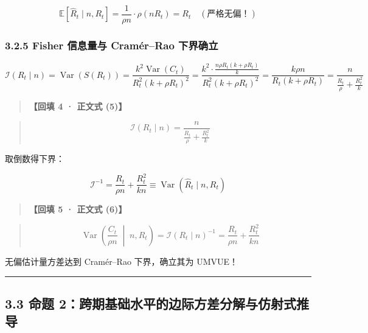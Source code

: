 \documentclass[11pt,a4paper]{ctexart}
\begin{document}
\[
\mathbb{E}[\widehat{R}_t \mid n, R_t] = \frac{1}{\rho n} \cdot \rho (n R_t) = R_t \quad (\text{严格无偏！})
\]

\subsubsection{3.2.5 Fisher 信息量与 Cramér–Rao 下界确立}
\[
\mathcal{I}(R_t \mid n) = \operatorname{Var}(S(R_t)) = \frac{k^2 \operatorname{Var}(C_t)}{R_t^2(k + \rho R_t)^2} = \frac{k^2 \cdot \frac{n \rho R_t (k + \rho R_t)}{k}}{R_t^2(k + \rho R_t)^2} = \frac{k \rho n}{R_t(k + \rho R_t)} = \frac{n}{\frac{R_t}{\rho} + \frac{R_t^2}{k}}
\]

\begin{quote}\small\color{black!75}
\textbf{【回填 4 · 正文式 (5)】}
\end{quote}
\begin{quote}\small\color{black!75}
\begin{equation*}
\mathcal{I}(R_t \mid n) = \frac{n}{\frac{R_t}{\rho} + \frac{R_t^2}{k}} \tag{eq:fisher\_info}
\end{equation*}
\end{quote}

取倒数得下界：

\[
\mathcal{I}^{-1} = \frac{R_t}{\rho n} + \frac{R_t^2}{kn} \equiv \operatorname{Var}(\widehat{R}_t \mid n, R_t)
\]

\begin{quote}\small\color{black!75}
\textbf{【回填 5 · 正文式 (6)】}
\end{quote}
\begin{quote}\small\color{black!75}
\begin{equation*}
\operatorname{Var}\!\left(\frac{C_t}{\rho n} \;\middle|\; n, R_t\right) = \mathcal{I}(R_t \mid n)^{-1} = \frac{R_t}{\rho n} + \frac{R_t^2}{k n} \tag{eq:var\_prop1}
\end{equation*}
\end{quote}

无偏估计量方差达到 Cramér–Rao 下界，确立其为 UMVUE！


\vspace{0.8em}\hrule\vspace{0.8em}

\subsection{3.3 命题 2：跨期基础水平的边际方差分解与仿射式推导}
\end{document}
